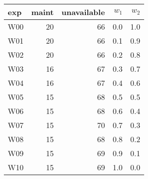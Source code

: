 \begin{tabular}{lrrrr}
\toprule
 exp &  maint &  unavailable &  $w_1$ &  $w_2$ \\
\midrule
 W00 &     20 &           66 &    0.0 &    1.0 \\
 W01 &     20 &           66 &    0.1 &    0.9 \\
 W02 &     20 &           66 &    0.2 &    0.8 \\
 W03 &     16 &           67 &    0.3 &    0.7 \\
 W04 &     16 &           67 &    0.4 &    0.6 \\
 W05 &     15 &           68 &    0.5 &    0.5 \\
 W06 &     15 &           68 &    0.6 &    0.4 \\
 W07 &     15 &           70 &    0.7 &    0.3 \\
 W08 &     15 &           68 &    0.8 &    0.2 \\
 W09 &     15 &           69 &    0.9 &    0.1 \\
 W10 &     15 &           69 &    1.0 &    0.0 \\
\bottomrule
\end{tabular}
